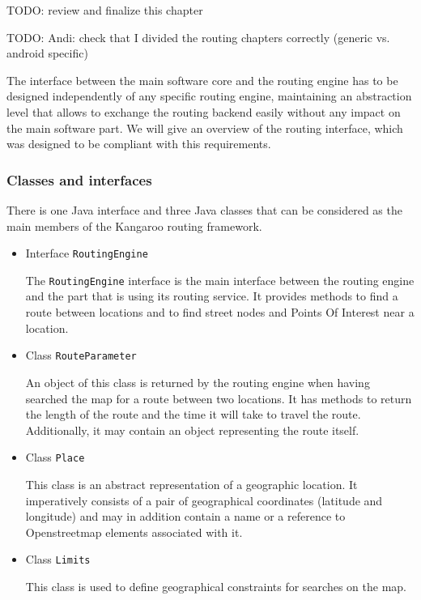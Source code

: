 TODO: review and finalize this chapter

TODO: Andi: check that I divided the routing chapters correctly (generic vs. android specific)

The interface between the main software core and the routing engine has to be designed independently of any specific routing engine, maintaining an abstraction level that allows to exchange the routing backend easily without any impact on the main software part. We will give an overview of the routing interface, which was designed to be compliant with this requirements.

\subsubsection{Classes and interfaces}

There is one Java interface and three Java classes that can be considered as the main members of the Kangaroo routing framework.

\begin{itemize}

	\item Interface \texttt{RoutingEngine}
	
		The \texttt{RoutingEngine} interface is the main interface between the routing engine and the part that is using its routing service. It provides methods to find a route between locations and to find street nodes and Points Of Interest near a location.
		
	\item Class \texttt{RouteParameter}
	
		An object of this class is returned by the routing engine when having searched the map for a route between two locations. It has methods to return the length of the route and the time it will take to travel the route. Additionally, it may contain an object representing the route itself.
	
	\item Class \texttt{Place}
	
		This class is an abstract representation of a geographic location. It imperatively consists of a pair of geographical coordinates (latitude and longitude) and may in addition contain a name or a reference to Openstreetmap elements associated with it.
	
	\item Class \texttt{Limits}
	
		This class is used to define geographical constraints for searches on the map.

\end{itemize}



